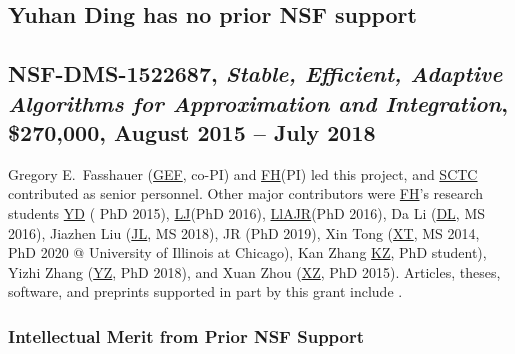 \documentclass[11pt]{NSFamsart}
\newcommand{\FH}{\hyperlink{FHlink}{FH}\xspace}
\newcommand{\SCTC}{\hyperlink{SCTClink}{SCTC}\xspace}
\newcommand{\GEF}{\hyperlink{GEFlink}{GEF}\xspace}
\newcommand{\YD}{\hyperlink{YDlink}{YD}\xspace}
\newcommand{\LlAJR}{\hyperlink{LlAJRlink}{LlAJR}\xspace}
\newcommand{\LJ}{\hyperlink{LJlink}{LJ}\xspace}
\newcommand{\XT}{\hyperlink{XTlink}{XT}\xspace}
\newcommand{\KZ}{\hyperlink{KZlink}{KZ}\xspace}
\newcommand{\DL}{\hyperlink{DLlink}{DL}\xspace}
\newcommand{\XZ}{\hyperlink{XZlink}{XZ}\xspace}
\newcommand{\JL}{\hyperlink{JLlink}{JL}\xspace}
\newcommand{\YZ}{\hyperlink{YZlink}{YZ}\xspace}
\def\abs#1{\ensuremath{\left \lvert #1 \right \rvert}}
\begin{document}
\subsection{Yuhan Ding has no prior NSF support}

\subsection{NSF-DMS-1522687, \emph{Stable, Efficient, Adaptive Algorithms for
			Approximation and Integration},
		\$270,000, August 2015 -- July 2018} \label{sec:PreviousFred}

Gregory E.\ Fasshauer (\GEF, co-PI) and \FH (PI) led this project, and \SCTC contributed as senior personnel.  Other major contributors were \FH's research students {\YD} ( PhD 2015), \LJ (PhD 2016),
\LlAJR (PhD 2016), \hypertarget{DLlink}{Da Li} (\DL, MS 2016), \hypertarget{JLlink}{Jiazhen Liu} (\JL, MS 2018), JR (PhD 2019), \hypertarget{XTlink}{Xin Tong} (\XT, MS 2014, PhD 2020 @ University of Illinois at Chicago), \hypertarget{KZlink}{Kan Zhang} \KZ, PhD student), \hypertarget{YZlink}{Yizhi Zhang} (\YZ, PhD 2018), and \hypertarget{XZlink}{Xuan Zhou} (\XZ, PhD 2015).  Articles, theses,
software, and preprints supported in
part by this
grant
include
\cite{ala_augmented_2017,
	ChoEtal17a,
	ChoEtal20a,
	Din15a,
	DinHic20a,
	GilEtal16a,
	Hic17a,
	HicJag18b,
	HicJim16a,
	HicEtal18a,
	HicEtal17a,
	HicKriWoz19a,
	RatHic19a,
	GilJim16b,
	JimHic16a,
	JohFasHic18a,
	Li16a,
	Liu17a,
	MarEtal18a,
	mccourt_stable_2017,
	MCCEtal19a,
	mishra_hybrid_2018,
	MisEtal19a,
	rashidinia_stable_2016,
	rashidinia_stable_2018,
	Zha18a,
	Zha17a,
	Zho15a,
	ZhoHic15a}.

\subsubsection{Intellectual Merit from Prior NSF Support}
\label{previousmeritsubsec}
\phantom{a}

\end{document}
